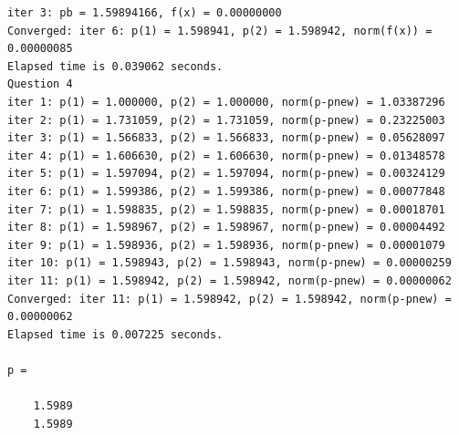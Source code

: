 \documentclass[12pt]{article}
\begin{document}
\begin{tiny}
\begin{verbatim}
iter 3: pb = 1.59894166, f(x) = 0.00000000
Converged: iter 6: p(1) = 1.598941, p(2) = 1.598942, norm(f(x)) = 0.00000085
Elapsed time is 0.039062 seconds.
Question 4
iter 1: p(1) = 1.000000, p(2) = 1.000000, norm(p-pnew) = 1.03387296
iter 2: p(1) = 1.731059, p(2) = 1.731059, norm(p-pnew) = 0.23225003
iter 3: p(1) = 1.566833, p(2) = 1.566833, norm(p-pnew) = 0.05628097
iter 4: p(1) = 1.606630, p(2) = 1.606630, norm(p-pnew) = 0.01348578
iter 5: p(1) = 1.597094, p(2) = 1.597094, norm(p-pnew) = 0.00324129
iter 6: p(1) = 1.599386, p(2) = 1.599386, norm(p-pnew) = 0.00077848
iter 7: p(1) = 1.598835, p(2) = 1.598835, norm(p-pnew) = 0.00018701
iter 8: p(1) = 1.598967, p(2) = 1.598967, norm(p-pnew) = 0.00004492
iter 9: p(1) = 1.598936, p(2) = 1.598936, norm(p-pnew) = 0.00001079
iter 10: p(1) = 1.598943, p(2) = 1.598943, norm(p-pnew) = 0.00000259
iter 11: p(1) = 1.598942, p(2) = 1.598942, norm(p-pnew) = 0.00000062
Converged: iter 11: p(1) = 1.598942, p(2) = 1.598942, norm(p-pnew) = 0.00000062
Elapsed time is 0.007225 seconds.

p =

    1.5989
    1.5989


\end{verbatim}
\end{tiny}
\end{document}
